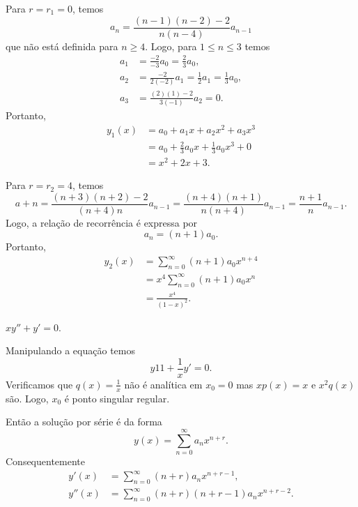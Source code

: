 \documentclass[a4paper,12pt, leqno, answers]{exam}
\begin{document}
\begin{questions}
\begin{solution}
        Para $r = r_1 = 0$, temos
        \[
        a_n = \frac{\left( n - 1 \right) \left( n - 2 \right) - 2}{n \left( n - 4 \right)} a_{n - 1}
        \]
        que n\~{a}o est\'{a} definida para $n \geq 4$. Logo, para $1 \leq n \leq 3$ temos
        \begin{align*}
            a_1 &= \frac{-2}{-3} a_0 = \frac{2}{3} a_0, \\
            a_2 &= \frac{-2}{2 \left( -2 \right)} a_1 = \frac{1}{2} a_1 = \frac{1}{3} a_0, \\
            a_3 &= \frac{\left( 2 \right) \left( 1 \right) - 2}{3\left( -1 \right)} a_2 = 0.
        \end{align*}
        Portanto,
        \begin{align*}
            y_1(x) &= a_0 + a_1 x + a_2 x^2 + a_3 x^3 \\
            &= a_0 + \frac{2}{3} a_0 x + \frac{1}{3} a_0 x^3 + 0 \\
            &= x^2 + 2 x + 3.
        \end{align*}

        Para $r = r_2 = 4$, temos
        \[
        a+n = \frac{\left( n + 3 \right) \left( n + 2 \right) - 2}{\left( n + 4 \right) n} a_{n - 1} = \frac{\left( n + 4 \right) \left( n + 1 \right)}{n \left( n + 4 \right)} a_{n - 1} = \frac{n + 1}{n} a_{n - 1}.
        \]
        Logo, a rela\c{c}\~{a}o de recorr\^{e}ncia \'{e} expressa por
        \[
        a_n = \left( n + 1 \right) a_0.
        \]
        Portanto,
        \begin{align*}
            y_2 (x) &= \sum_{n = 0}^\infty \left( n + 1 \right) a_0 x^{n + 4} \\
            &= x^4 \sum_{n = 0}^\infty \left( n + 1 \right) a_0 x^n \\
            &= \frac{x^4}{\left( 1 - x \right)^2}.
        \end{align*}
    \end{solution}

    \question $x y'' + y' = 0$.
    \begin{solution}
        Manipulando a equa\c{c}\~{a}o temos
        \[
        y11 + \frac{1}{x} y' = 0.
        \]
        Verificamos que $q(x) = \frac{1}{x}$ n\~{a}o \'{e} anal\'{i}tica em $x_0 = 0$ mas $x p(x) = x$ e $x^2 q(x)$ s\~{a}o. Logo, $x_0$ \'{e} ponto singular regular.

        Ent\~{a}o a solu\c{c}\~{a}o por s\'{e}rie \'{e} da forma
        \[
        y(x) = \sum_{n = 0}^\infty a_n x^{n + r}.
        \]
        Consequentemente
        \begin{align*}
            y'(x) &= \sum_{n = 0}^\infty \left( n + r \right) a_n x^{n + r - 1}, \\
            y''(x) &= \sum_{n = 0}^\infty \left( n + r \right) \left( n + r - 1 \right) a_n x^{n + r - 2}.
        \end{align*}


\end{solution}
\end{questions}
\end{document}
